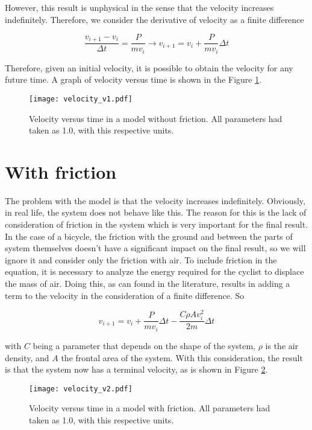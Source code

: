 \documentclass{article}
\begin{document}
However, this result is unphysical in the sense that the velocity increases indefinitely. Therefore, we consider the derivative of velocity as a finite difference


$$ \frac{v_{i+1} - v_i}{\Delta t} = \frac{P}{mv_{i}} \rightarrow v_{i+1} = v_i + \frac{P}{mv_{i}}\Delta t$$

Therefore, given an initial velocity, it is possible to obtain the velocity for any future time. A graph of velocity versus time is shown in the Figure \ref{f1}.

\begin{figure}[!h]
  \centering
  \texttt{[image: velocity\_v1.pdf]}
  \caption{Velocity versus time in a model without friction. All parameters had taken as 1.0, with this respective units.}
  \label{f1}
\end{figure}

\section{With friction}

The problem with the model is that the velocity increases indefinitely. Obviously, in real life, the system does not behave like this. The reason for this is the lack of consideration of friction in the system which is very important for the final result. In the case of a bicycle, the friction with the ground and between the parts of system themselves doesn't have a significant impact on the final result, so we will ignore it and consider only the friction with air. To include friction in the equation, it is necessary to analyze the energy required for the cyclist to displace the mass of air. Doing this, as can found in the literature, results in adding a term to the velocity in the consideration of a finite difference. So

\begin{equation}
  v_{i+1} = v_i + \frac{P}{mv_{i}}\Delta t - \frac{C\rho A v_i^2}{2m}\Delta t
\end{equation}

with $C$ being a parameter that depends on the shape of the system, $\rho$ is the air density, and $A$ the frontal area of the system. With this consideration, the result is that the system now has a terminal velocity, as is shown in Figure \ref{F2}.

\begin{figure}[!h]
  \centering
  \texttt{[image: velocity\_v2.pdf]}
  \caption{Velocity versus time in a model with friction. All parameters had taken as 1.0, with this respective units.}
  \label{F2}
\end{figure}
\end{document}
